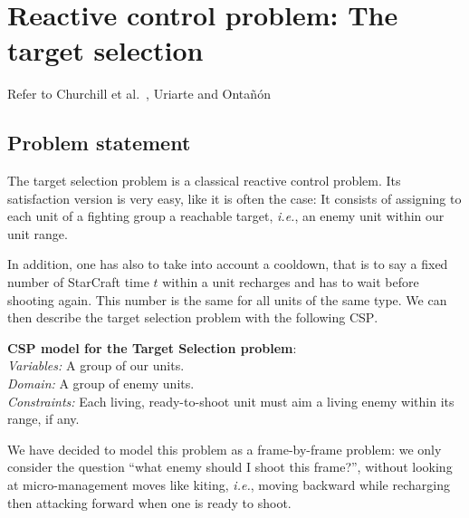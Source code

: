 \documentclass[journal]{IEEEtran}
\newcommand{\csp}{\textsc{CSP}\xspace}
\newcommand{\ghost}{\textsc{GHOST}\xspace}
\newcommand{\ie}{\textit{i.e.}}
\newcommand{\modelcsp}[4]%
{ \begin{trivlist}
  \item[]%
    \textbf{CSP model for #1}:\\
    \textit{Variables:} #2\\
    \textit{Domain:} #3\\
    \textit{Constraints:} #4
  \end{trivlist}%
}
\begin{document}

\section{Reactive control problem: The target selection}\label{sec:target}

Refer to Churchill  et al.~\cite{ChurchillSB12, ChurchillB12}, Uriarte
and Onta{\~n}{\'o}n~\cite{UriarteO12}

\subsection{Problem statement}

The  target   selection  problem  is  a   classical  reactive  control
problem. Its satisfaction  version is very easy, like it  is often the
case: It  consists of  assigning to  each unit of  a fighting  group a
reachable target, \ie, an enemy unit within our unit range.

In addition, one has also to take  into account a cooldown, that is to
say a fixed  number of StarCraft time $t$ within  a unit recharges and
has to  wait before shooting  again. This number  is the same  for all
units of  the same  type. We  can then  describe the  target selection
problem with the following \csp.

\modelcsp{the Target Selection problem}%
{A group of our units.}%
{A group of enemy units.}%
{Each living, ready-to-shoot  unit must aim a living  enemy within its
  range, if any.}

We have decided to model this  problem as a frame-by-frame problem: we
only consider the question ``what  enemy should I shoot this frame?'',
without  looking at  micro-management moves  like kiting,  \ie, moving
backward while recharging then attacking  forward when one is ready to
shoot.
\end{document}
